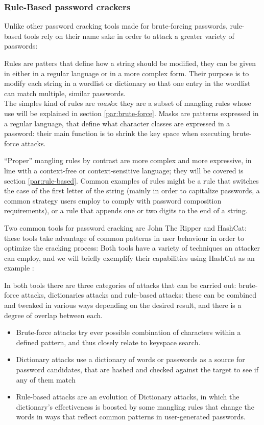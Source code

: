\subsubsection{Rule-Based password crackers} \label{hash_and_jtr}
Unlike other password cracking tools made for brute-forcing passwords, rule-based tools rely on their name sake in order to attack a greater variety of passwords:

Rules are patters that define how a string should be modified, they can be given in either in a regular language or in a more complex form.
Their purpose is to modify each string in a wordlist or dictionary so that one entry in the wordlist can match multiple, similar passwords.\\

The simples kind of rules are \emph{masks}: they are a subset of mangling rules whose use will be explained in section \ref{par:brute-force}. Masks are patterns expressed in a regular language, that define what character classes are expressed in a password: their main function is to shrink the key space when executing brute-force attacks.

\enquote{Proper} mangling rules by contrast are more complex and more expressive, in line with a context-free or context-sensitive language; they will be covered is section \ref{par:rule-based}.
Common examples of rules might be a rule that switches the case of the first letter of the string (mainly in order to capitalize passwords, a common strategy users employ to comply with password composition requirements), or a rule that appends one or two digits to the end of a string. 

Two common tools for password cracking are John The Ripper and \break \mbox{HashCat}\cite{john,hash_cat}: these tools take advantage of common patterns in user behaviour in order to optimize the cracking process: Both tools have a variety of techniques an attacker can employ, and we will briefly exemplify their capabilities using HashCat as an example \cite{hash_cat_wiki}:

In both tools there are three categories of attacks that can be carried out: brute-force attacks, dictionaries attacks and rule-based attacks: these can be combined and tweaked in various ways depending on the desired result, and there is a degree of overlap between each.


\begin{itemize}
\item Brute-force attacks try ever possible combination of characters within a defined pattern, and thus closely relate to keyspace search. 
\item Dictionary attacks use a dictionary of words or passwords as a source for password candidates, that are hashed and checked against the target to see if any of them match
\item Rule-based attacks are an evolution of Dictionary attacks, in which the dictionary's effectiveness is boosted by some mangling rules that change the words in ways that reflect common patterns in user-generated passwords.
\end{itemize}

